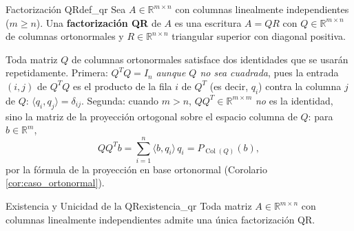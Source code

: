 \documentclass[11pt, a4paper]{article}
\begin{document}
\begin{definicion}{Factorización QR}{def_qr}
Sea $A \in \mathbb{R}^{m \times n}$ con columnas linealmente independientes ($m \ge n$). Una \textbf{factorización QR} de $A$ es una escritura $A = QR$ con $Q \in \mathbb{R}^{m \times n}$ de columnas ortonormales y $R \in \mathbb{R}^{n \times n}$ triangular superior con diagonal positiva.
\end{definicion}

\obs Toda matriz $Q$ de columnas ortonormales satisface dos identidades que se usarán repetidamente. Primera: $Q^T Q = I_n$ \emph{aunque $Q$ no sea cuadrada}, pues la entrada $(i, j)$ de $Q^T Q$ es el producto de la fila $i$ de $Q^T$ (es decir, $q_i$) contra la columna $j$ de $Q$: $\langle q_i, q_j \rangle = \delta_{ij}$. Segunda: cuando $m > n$, $Q Q^T \in \mathbb{R}^{m \times m}$ \emph{no} es la identidad, sino la matriz de la proyección ortogonal sobre el espacio columna de $Q$: para $b \in \mathbb{R}^m$,
\[
Q Q^T b = \sum_{i=1}^{n} \langle b, q_i \rangle \, q_i = P_{\operatorname{Col}(Q)}(b),
\]
por la fórmula de la proyección en base ortonormal (Corolario \ref{cor:caso_ortonormal}).

\begin{teorema}{Existencia y Unicidad de la QR}{existencia_qr}
Toda matriz $A \in \mathbb{R}^{m \times n}$ con columnas linealmente independientes admite una única factorización QR.
\end{teorema}
\end{document}
